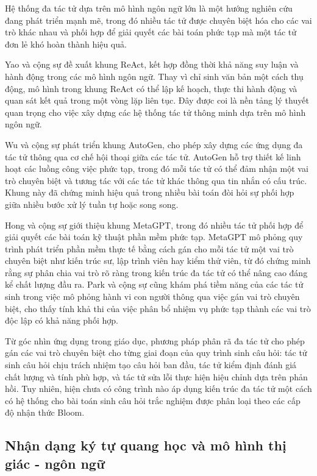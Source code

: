 Hệ thống đa tác tử dựa trên mô hình ngôn ngữ lớn là một hướng nghiên cứu đang phát triển mạnh mẽ, trong đó nhiều tác tử được chuyên biệt hóa cho các vai trò khác nhau và phối hợp để giải quyết các bài toán phức tạp mà một tác tử đơn lẻ khó hoàn thành hiệu quả.

Yao và cộng sự \cite{yao2022react} đề xuất khung ReAct, kết hợp đồng thời khả năng suy luận và hành động trong các mô hình ngôn ngữ. Thay vì chỉ sinh văn bản một cách thụ động, mô hình trong khung ReAct có thể lập kế hoạch, thực thi hành động và quan sát kết quả trong một vòng lặp liên tục. Đây được coi là nền tảng lý thuyết quan trọng cho việc xây dựng các hệ thống tác tử thông minh dựa trên mô hình ngôn ngữ.

Wu và cộng sự \cite{wu2023autogen} phát triển khung AutoGen, cho phép xây dựng các ứng dụng đa tác tử thông qua cơ chế hội thoại giữa các tác tử. AutoGen hỗ trợ thiết kế linh hoạt các luồng công việc phức tạp, trong đó mỗi tác tử có thể đảm nhận một vai trò chuyên biệt và tương tác với các tác tử khác thông qua tin nhắn có cấu trúc. Khung này đã chứng minh hiệu quả trong nhiều bài toán đòi hỏi sự phối hợp giữa nhiều bước xử lý tuần tự hoặc song song.

Hong và cộng sự \cite{hong2023metagpt} giới thiệu khung MetaGPT, trong đó nhiều tác tử phối hợp để giải quyết các bài toán kỹ thuật phần mềm phức tạp. MetaGPT mô phỏng quy trình phát triển phần mềm thực tế bằng cách gán cho mỗi tác tử một vai trò chuyên biệt như kiến trúc sư, lập trình viên hay kiểm thử viên, từ đó chứng minh rằng sự phân chia vai trò rõ ràng trong kiến trúc đa tác tử có thể nâng cao đáng kể chất lượng đầu ra. Park và cộng sự \cite{park2023generative} cũng khám phá tiềm năng của các tác tử sinh trong việc mô phỏng hành vi con người thông qua việc gán vai trò chuyên biệt, cho thấy tính khả thi của việc phân bổ nhiệm vụ phức tạp thành các vai trò độc lập có khả năng phối hợp.

Từ góc nhìn ứng dụng trong giáo dục, phương pháp phân rã đa tác tử cho phép gán các vai trò chuyên biệt cho từng giai đoạn của quy trình sinh câu hỏi: tác tử sinh câu hỏi chịu trách nhiệm tạo câu hỏi ban đầu, tác tử kiểm định đánh giá chất lượng và tính phù hợp, và tác tử sửa lỗi thực hiện hiệu chỉnh dựa trên phản hồi. Tuy nhiên, hiện chưa có công trình nào áp dụng kiến trúc đa tác tử một cách có hệ thống cho bài toán sinh câu hỏi trắc nghiệm được phân loại theo các cấp độ nhận thức Bloom.

\subsection{Nhận dạng ký tự quang học và mô hình thị giác - ngôn ngữ}

